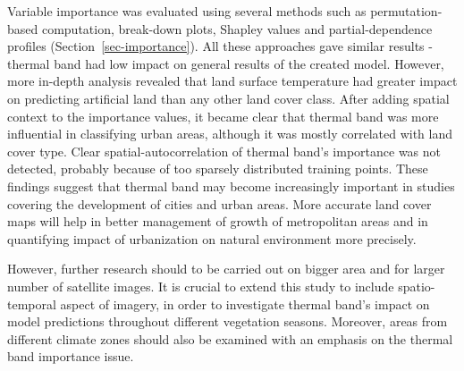 \documentclass{amuthesis}
\begin{document}
Variable importance was evaluated using several methods such as
permutation-based computation, break-down plots, Shapley values and
partial-dependence profiles (Section~\ref{sec-importance}). All these
approaches gave similar results - thermal band had low impact on general
results of the created model. However, more in-depth analysis revealed
that land surface temperature had greater impact on predicting
artificial land than any other land cover class. After adding spatial
context to the importance values, it became clear that thermal band was
more influential in classifying urban areas, although it was mostly
correlated with land cover type. Clear spatial-autocorrelation of
thermal band's importance was not detected, probably because of too
sparsely distributed training points. These findings suggest that
thermal band may become increasingly important in studies covering the
development of cities and urban areas. More accurate land cover maps
will help in better management of growth of metropolitan areas and in
quantifying impact of urbanization on natural environment more
precisely.

However, further research should to be carried out on bigger area and
for larger number of satellite images. It is crucial to extend this
study to include spatio-temporal aspect of imagery, in order to
investigate thermal band's impact on model predictions throughout
different vegetation seasons. Moreover, areas from different climate
zones should also be examined with an emphasis on the thermal band
importance issue.

\printbibliography[heading=bibintoc, title=Bibliography]
\end{document}
